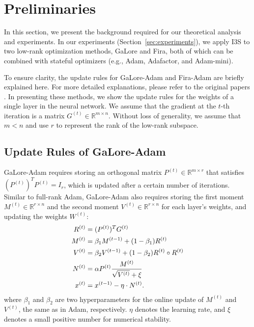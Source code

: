 \section{Preliminaries}
\label{sec:preliminaries}
In this section, we present the background required for our theoretical analysis and experiments. In our experiments (Section~\ref{sec:experiments}), we apply I3S to two low-rank optimization methods, GaLore and Fira, both of which can be combined with stateful optimizers (e.g., Adam, Adafactor, and Adam-mini). 

To ensure clarity, the update rules for GaLore-Adam and Fira-Adam are briefly explained here. For more detailed explanations, please refer to the original papers \cite{zhao2024galore, chen2024fira}. In presenting these methods, we show the update rules for the weights of a single layer in the neural network. We assume that the gradient at the $t$-th iteration is a matrix $G^{(t)} \in \mathbb{R}^{m \times n}$. Without loss of generality, we assume that $m < n$ and use $r$ to represent the rank of the low-rank subspace.

\subsection{Update Rules of GaLore-Adam}\label{sub:preliminaries:galore}

GaLore-Adam \cite{zhao2024galore} requires storing an orthogonal matrix $P^{(t)} \in \mathbb{R}^{m \times r}$ that satisfies $(P^{(t)})^TP^{(t)} = I_r$, which is updated after a certain number of iterations. Similar to full-rank Adam, GaLore-Adam also requires storing the first moment $M^{(t)} \in \mathbb{R}^{r \times n}$ and the second moment $V^{(t)} \in \mathbb{R}^{r \times n}$ for each layer's weights, and updating the weights $W^{(t)}$:
\begin{align}
    R^{(t)} &= (P^{(t)})^T G^{(t)} \notag\\
    M^{(t)} &= \beta_1 M^{(t-1)} + (1-\beta_1) R^{(t)} \notag\\
    V^{(t)} &= \beta_2 V^{(t-1)} + (1-\beta_2) R^{(t)} \circ R^{(t)} \notag\\
    N^{(t)} &= \alpha P^{(t)} \frac{M^{(t)}}{\sqrt{V^{(t)}} + \xi} \label{eq:N}\\
    x^{(t)} &= x^{(t-1)} - \eta \cdot N^{(t)}. \notag
\end{align}
where $\beta_1$ and $\beta_2$ are two hyperparameters for the online update of $M^{(t)}$ and $V^{(t)}$, the same as in Adam, respectively. $\eta$ denotes the learning rate, and $\xi$ denotes a small positive number for numerical stability.




